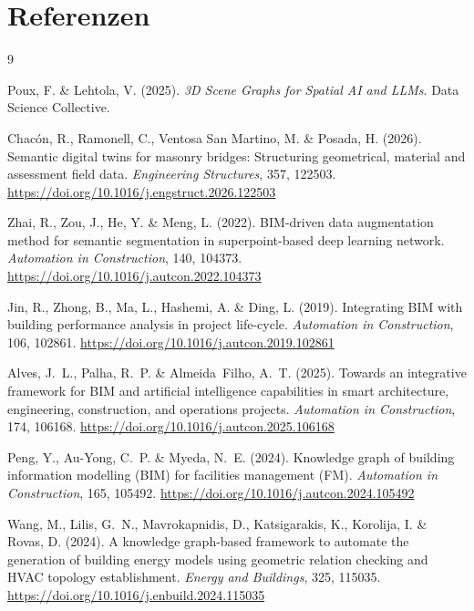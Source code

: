 \documentclass[a4paper,11pt]{article}
\begin{document}
\section*{Referenzen}

\begin{thebibliography}{9}

Poux, F. \& Lehtola, V. (2025).
\textit{3D Scene Graphs for Spatial AI and LLMs}.
Data Science Collective.

Chacón, R., Ramonell, C., Ventosa San Martino, M. \& Posada, H. (2026).
Semantic digital twins for masonry bridges: Structuring geometrical, material and assessment field data.
\textit{Engineering Structures}, 357, 122503.
\url{https://doi.org/10.1016/j.engstruct.2026.122503}

Zhai, R., Zou, J., He, Y. \& Meng, L. (2022).
BIM-driven data augmentation method for semantic segmentation in superpoint-based deep learning network.
\textit{Automation in Construction}, 140, 104373.
\url{https://doi.org/10.1016/j.autcon.2022.104373}

Jin, R., Zhong, B., Ma, L., Hashemi, A. \& Ding, L. (2019).
Integrating BIM with building performance analysis in project life-cycle.
\textit{Automation in Construction}, 106, 102861.
\url{https://doi.org/10.1016/j.autcon.2019.102861}

Alves, J.~L., Palha, R.~P. \& Almeida~Filho, A.~T. (2025).
Towards an integrative framework for BIM and artificial intelligence capabilities in smart architecture, engineering, construction, and operations projects.
\textit{Automation in Construction}, 174, 106168.
\url{https://doi.org/10.1016/j.autcon.2025.106168}

Peng, Y., Au-Yong, C.~P. \& Myeda, N.~E. (2024).
Knowledge graph of building information modelling (BIM) for facilities management (FM).
\textit{Automation in Construction}, 165, 105492.
\url{https://doi.org/10.1016/j.autcon.2024.105492}

Wang, M., Lilis, G.~N., Mavrokapnidis, D., Katsigarakis, K., Korolija, I. \& Rovas, D. (2024).
A knowledge graph-based framework to automate the generation of building energy models using geometric relation checking and HVAC topology establishment.
\textit{Energy and Buildings}, 325, 115035.
\url{https://doi.org/10.1016/j.enbuild.2024.115035}


\end{thebibliography}
\end{document}

